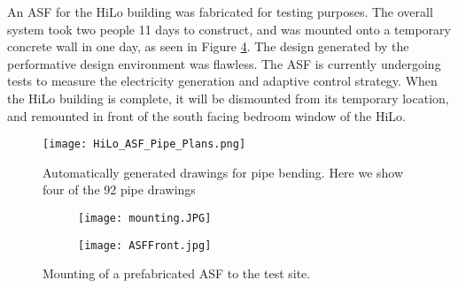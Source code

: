 An ASF for the HiLo building was fabricated for testing purposes. The overall system took two people 11 days to construct, and was mounted onto a temporary concrete wall in one day, as seen in Figure \ref{fig:mounting}. The design generated by the performative design environment was flawless. The ASF is currently undergoing tests to measure the electricity generation and adaptive control strategy. When the HiLo building is complete, it will be dismounted from its temporary location, and remounted in front of the south facing bedroom window of the HiLo. 

\begin{figure}
\begin{center}
\texttt{[image: HiLo\_ASF\_Pipe\_Plans.png]}
\caption{Automatically generated drawings for pipe bending. Here we show four of the 92 pipe drawings}
\label{fig:pipeplans}
\end{center}
\end{figure}

\begin{figure}
    \centering
    \begin{subfigure}[b]{0.47\textwidth}
        \texttt{[image: mounting.JPG]}
        \caption{} 
        \label{fig:mountingCrane}
    \end{subfigure} 
    \begin{subfigure}[b]{0.47\textwidth}
        \texttt{[image: ASFFront.jpg]}
        \caption{}
        \label{fig:mountingFront}
    \end{subfigure}
    \hfill

    \caption{Mounting of a prefabricated ASF to the test site.}
    \label{fig:mounting}
\end{figure}